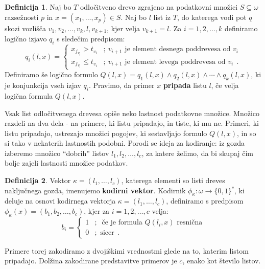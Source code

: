 \documentclass[12pt,a4paper,twoside]{article}
\theoremstyle{definition} %
\newtheorem{definicija}{Definicija}[section]
\theoremstyle{plain} %
\numberwithin{equation}{section}  %
\begin{document}
\begin{definicija}
\label{def-pripadnost-listu}
	Naj bo $T$ odločitveno drevo zgrajeno na podatkovni množici $S \subseteq \omega$ razsežnosti $p$ in $x=(x_1,\ldots,x_p) \in S$. 
	Naj bo $l$ list iz $T$, do katerega vodi pot $q$ skozi vozlišča $v_1, v_2, \ldots, v_k, l, v_{k+1}$, kjer velja $v_{k+1} = l$.
	Za $i=1,2,\ldots,k$ definiramo logično izjavo $q_i$ s sledečim predpisom:
	\[
	q_i(l,x) =
	\begin{cases}
	x_{f_{v_i}} > t_{v_i} &;\ v_{i+1} \text{ je element desnega poddrevesa od } v_i \\
	x_{f_{v_i}} \leq t_{v_i} &;\ v_{i+1} \text{ je element levega poddrevesa od } v_i\ \ .
	\end{cases}
	\]
	Definiramo še logično formulo $Q(l,x)=q_1(l,x) \land q_2(l,x) \land \cdots \land q_k(l,x)$, ki je konjunkcija vseh izjav $q_i$.
	Pravimo, da primer $x$ \textbf{pripada} listu $l$, če velja logična formula $Q(l,x)$.
\end{definicija}

Vsak list odločitvenega drevesa opiše neko lastnost podatkovne množice. 
Množico razdeli na dva dela - na primere, ki listu pripadajo, in tiste, ki mu ne.
Primeri, ki listu pripadajo, ustrezajo množici pogojev, ki sestavljajo formulo $Q(l,x)$, in so si tako v nekaterih lastnostih podobni. %
Porodi se ideja za kodiranje: iz gozda izberemo množico ``dobrih'' listov $l_1, l_2, \ldots, l_c$, za katere želimo, da bi skupaj čim bolje zajeli lastnosti množice podatkov.

\begin{definicija}
\label{def-kodiranje}
	Vektor $\kappa=(l_1,\ldots,l_c)$, katerega elementi so listi dreves naključnega gozda, imenujemo \textbf{kodirni vektor}.
	Kodirnik $\phi_\kappa: \omega \rightarrow \{0,1\}^c$, ki deluje na osnovi kodirnega vektorja $\kappa=(l_1,\ldots, l_c)$, definiramo s predpisom $\phi_\kappa(x) = (b_1, b_2, \ldots, b_c)$, kjer za $i=1,2,\ldots,c$ velja:
	$$
	b_i = 
	\begin{cases}
	1 &;\ \text{ če je formula } Q(l_i,x) \text{ resnična} \\
	0 &; \text{ sicer}\ \ .
	\end{cases}
	$$
\end{definicija}
Primere torej zakodiramo z dvojiškimi vrednostmi glede na to, katerim listom pripadajo. 
Dolžina zakodirane predstavitve primerov je $c$, enako kot število listov.
\end{document}
